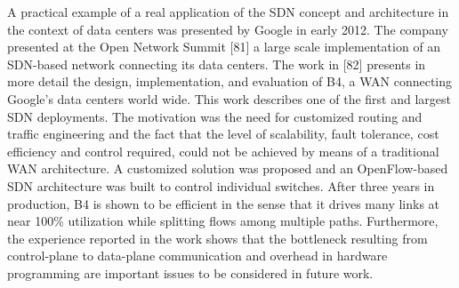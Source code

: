 A practical example of a real application of the SDN concept and architecture in the context of data centers was presented by Google in early 2012. The company presented at the Open Network Summit [81] a large scale implementation of an SDN-based network connecting its data centers. The work in [82] presents in more detail the design, implementation, and evaluation of B4, a WAN connecting Google’s data centers world wide. This work describes one of the first and largest SDN deployments. The motivation was the need for customized routing and traffic engineering and the fact that the level of scalability, fault tolerance, cost efficiency and control required, could not be achieved by means of a traditional WAN architecture. A customized solution was proposed and an OpenFlow-based SDN architecture was built to control individual switches. After three years in production, B4 is
shown to be efficient in the sense that it drives many links at near 100\% utilization while splitting flows among multiple
paths. Furthermore, the experience reported in the work shows that the bottleneck resulting from control-plane to data-plane
communication and overhead in hardware programming are important issues to be considered in future work. \cite{SurveySDNApplications}







